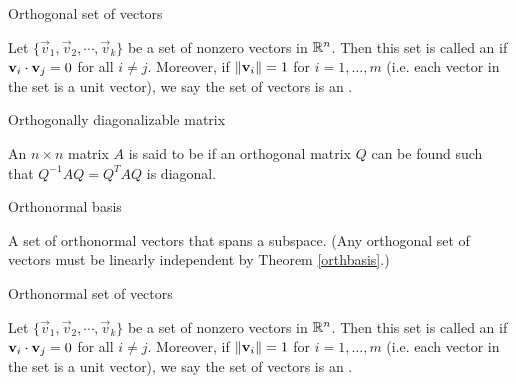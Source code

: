 \documentclass{ximera}
\begin{document}

Orthogonal set of vectors
\begin{expandable}
    Let $\{ \vec{v}_1, \vec{v}_2, \cdots, \vec{v}_k \}$ be a set of nonzero
vectors in $\mathbb{R}^n$. Then this set is called an
 if 
$\mathbf{v}_i \cdot \mathbf{v}_j = 0$ for all $i \neq j$.
Moreover, if $\left\lVert\mathbf{v}_i\right\rVert=1$ for $i=1,\ldots,m$ (i.e. each vector in the set is a unit vector), we say the set of vectors is an .
\end{expandable}


Orthogonally diagonalizable matrix
\begin{expandable}
    An $n \times n$ matrix $A$ is said to be  if an orthogonal matrix $Q$ can be found such that  $Q^{-1}AQ = Q^{T}AQ$ is diagonal.
\end{expandable}


Orthonormal basis
\begin{expandable}
    A set of orthonormal vectors that spans a subspace. (Any orthogonal set of vectors must be linearly independent by Theorem \ref{orthbasis}.)
\end{expandable}


Orthonormal set of vectors
\begin{expandable}
    Let $\{ \vec{v}_1, \vec{v}_2, \cdots, \vec{v}_k \}$ be a set of nonzero
vectors in $\mathbb{R}^n$. Then this set is called an
 if 
$\mathbf{v}_i \cdot \mathbf{v}_j = 0$ for all $i \neq j$.
Moreover, if $\left\lVert\mathbf{v}_i\right\rVert=1$ for $i=1,\ldots,m$ (i.e. each vector in the set is a unit vector), we say the set of vectors is an .
\end{expandable}
\end{document}
